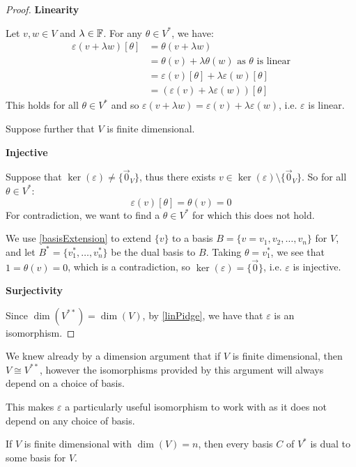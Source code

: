 \documentclass[../main.tex]{subfiles}
\begin{document}
\begin{proof}\par
  \textbf{Linearity}\par
  Let $v, w \in V$ and $\lambda \in \mathbb{F}$.
  For any $\theta \in V^{*}$, we have:
  \begin{align*}
    \varepsilon(v + \lambda w)[\theta] &= \theta(v + \lambda w) \\
                                       &= \theta(v) + \lambda \theta(w) \text{ as $\theta$ is linear} \\
                                       &= \varepsilon(v)[\theta] + \lambda \varepsilon(w)[\theta] \\
                                       &= (\varepsilon(v) + \lambda\varepsilon(w))[\theta]
  \end{align*}
  This holds for all $\theta \in V^{*}$ and so $\varepsilon(v + \lambda w) = \varepsilon(v) + \lambda \varepsilon(w)$, i.e. $\varepsilon$ is linear.

  Suppose further that $V$ is finite dimensional.\par
  \textbf{Injective}\par
  Suppose that $\ker(\varepsilon) \neq \{\vec{0}_{V}\}$, thus there exists $v \in \ker(\varepsilon) \setminus \{\vec{0}_{V}\}$.
  So for all $\theta \in V^{*}$:
  \[
    \varepsilon(v)[\theta] = \theta(v) = 0
  \]
  For contradiction, we want to find a $\theta \in V^{*}$ for which this does not hold.

  We use \cref{basisExtension} to extend $\{v\}$ to a basis $B = \{v = v_1, v_2, \ldots, v_n\}$ for $V$, and let $B^{*} = \{v^{*}_1, \ldots, v^{*}_n\}$ be the dual basis to $B$.
  Taking $\theta= v^{*}_1$, we see that $1 = \theta(v) = 0$, which is a contradiction, so $\ker(\varepsilon) = \{\vec{0}\}$, i.e. $\varepsilon$ is injective.

  \textbf{Surjectivity}\par
  Since $\dim(V^{**}) = \dim(V)$, by \cref{linPidge}, we have that $\varepsilon$ is an isomorphism.
\end{proof}
\begin{remark}
  We knew already by a dimension argument that if $V$ is finite dimensional, then $V \cong V^{**}$, however the isomorphisms provided by this argument will always depend on a choice of basis.

  This makes $\varepsilon$ a particularly useful isomorphism to work with as it does not depend on any choice of basis.
\end{remark}
\begin{proposition}
  If $V$ is finite dimensional with $\dim(V) = n$, then every basis $C$ of $V^{*}$ is dual to some basis for $V$.
\end{proposition}
\end{document}
